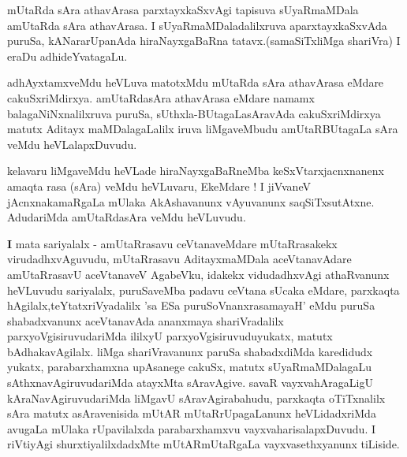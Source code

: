 \centerline{}

\begin{artha}
mUtaRda sAra athavArasa parxtayxkaSxvAgi tapisuva sUyaRmaMDala
amUtaRda sAra athavArasa. I sUyaRmaMDaladalilxruva aparxtayxkaSxvAda
puruSa, kANararUpanAda hiraNayxgaBaRna tatavx.(samaSiTxliMga shariVra)
I eraDu adhideYvatagaLu.

adhAyxtamxveMdu heVLuva matotxMdu mUtaRda sAra athavArasa eMdare
cakuSxriMdirxya. amUtaRdasAra athavArasa eMdare namamx
balagaNiNxnalilxruva puruSa, sUthxla-BUtagaLasAravAda cakuSxriMdirxya
matutx Aditayx maMDalagaLalilx iruva liMgaveMbudu amUtaRBUtagaLa sAra
veMdu heVLalapxDuvudu.
\end{artha}

\centerline{}

\begin{artha}
kelavaru liMgaveMdu heVLade hiraNayxgaBaRneMba keSxVtarxjacnxnanenx
amaqta rasa (sAra) veMdu heVLuvaru, EkeMdare ! I jiVvaneV
jAcnxnakamaRgaLa mUlaka AkAshavanunx vAyuvanunx
saqSiTxsutAtxne. AdudariMda amUtaRdasAra veMdu heVLuvudu.
\end{artha}

\begin{artha}
{\textbf I mata sariyalalx -} amUtaRrasavu ceVtanaveMdare
mUtaRrasakekx virudadhxvAguvudu, mUtaRrasavu AditayxmaMDala
aceVtanavAdare amUtaRrasavU aceVtanaveV AgabeVku, idakekx
vidudadhxvAgi athaRvanunx heVLuvudu sariyalalx, puruSaveMba padavu
ceVtana sUcaka eMdare, parxkaqta hAgilalx,teYtatxriVyadalilx 'sa ESa puruSoV\s nanxrasamayaH'
eMdu puruSa shabadxvanunx aceVtanavAda ananxmaya shariVradalilx
parxyoVgisiruvudariMda ililxyU parxyoVgisiruvuduyukatx, matutx
bAdhakavAgilalx. liMga shariVravanunx paruSa shabadxdiMda karedidudx
yukatx, parabarxhamxna upAsanege cakuSx, matutx sUyaRmaMDalagaLu
sAthxnavAgiruvudariMda atayxMta sAravAgive. savaR vayxvahAragaLigU
kAraNavAgiruvudariMda liMgavU sAravAgirabahudu, parxkaqta oTiTxnalilx
sAra matutx asAravenisida mUtAR mUtaRrUpagaLanunx heVLidadxriMda
avugaLa mUlaka rUpavilalxda parabarxhamxvu vayxvaharisalapxDuvudu. I riVtiyAgi shurxtiyalilxdadxMte mUtARmUtaRgaLa vayxvasethxyanunx tiLiside.
\end{artha}

\centerline{}
	
